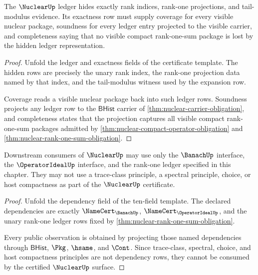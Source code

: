 \begin{theorem}\label{thm:nuclear-ledger-exactness-obligation}
The $\NuclearUp$ ledger hides exactly rank indices, rank-one projections, and tail-modulus evidence. Its exactness row must supply coverage for every visible nuclear package, soundness for every ledger entry projected to the visible carrier, and completeness saying that no visible compact rank-one-sum package is lost by the hidden ledger representation.
\end{theorem}
\begin{proof}
Unfold the ledger and exactness fields of the certificate template. The hidden rows are precisely the unary rank index, the rank-one projection data named by that index, and the tail-modulus witness used by the expansion row.

Coverage reads a visible nuclear package back into such ledger rows. Soundness projects any ledger row to the $\mathsf{BHist}$ carrier of \autoref{thm:nuclear-carrier-obligation}, and completeness states that the projection captures all visible compact rank-one-sum packages admitted by \autoref{thm:nuclear-compact-operator-obligation} and \autoref{thm:nuclear-rank-one-sum-obligation}.
\end{proof}

\begin{theorem}\label{thm:nuclear-dependency-boundary-obligation}
Downstream consumers of $\NuclearUp$ may use only the $\BanachUp$ interface, the $\OperatorIdealUp$ interface, and the rank-one ledger specified in this chapter. They may not use a trace-class principle, a spectral principle, choice, or host compactness as part of the $\NuclearUp$ certificate.
\end{theorem}
\begin{proof}
Unfold the dependency field of the ten-field template. The declared dependencies are exactly $\NameCert_{\BanachUp}$, $\NameCert_{\OperatorIdealUp}$, and the unary rank-one ledger rows fixed by \autoref{thm:nuclear-rank-one-sum-obligation}.

Every public observation is obtained by projecting those named dependencies through $\mathsf{BHist}$, $\Pkg$, $\hsame$, and $\Cont$. Since trace-class, spectral, choice, and host compactness principles are not dependency rows, they cannot be consumed by the certified $\NuclearUp$ surface.
\end{proof}

